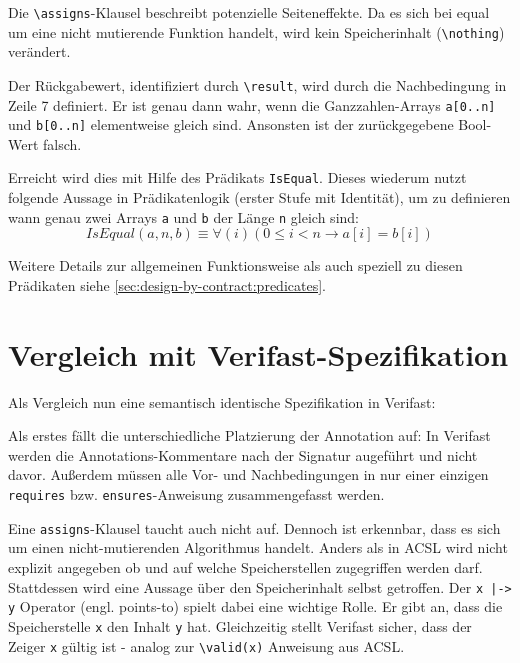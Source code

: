 Die \lstinline{\assigns}-Klausel beschreibt potenzielle Seiteneffekte. Da es sich bei equal um eine nicht mutierende
Funktion handelt, wird kein Speicherinhalt (\lstinline{\nothing}) verändert.

Der Rückgabewert, identifiziert durch \lstinline{\result}, wird durch die Nachbedingung in Zeile 7 definiert. Er ist genau dann
wahr, wenn die Ganzzahlen-Arrays \lstinline{a[0..n]} und \lstinline{b[0..n]} elementweise gleich sind. Ansonsten ist der 
zurückgegebene Bool-Wert falsch. 

Erreicht wird dies mit Hilfe des Prädikats \lstinline{IsEqual}. Dieses wiederum
nutzt folgende Aussage in Prädikatenlogik (erster Stufe mit Identität), um zu definieren wann genau 
zwei Arrays \lstinline{a} und \lstinline{b} der Länge \lstinline{n} gleich sind:
\[IsEqual(a, n, b) \equiv \forall(i) (0 \leq i < n \rightarrow a[i] = b[i])\]

Weitere Details zur allgemeinen Funktionsweise als auch speziell zu diesen Prädikaten siehe
\ref{sec:design-by-contract:predicates}.



\section{Vergleich mit Verifast-Spezifikation}
\label{sec:design-by-contract:verifast-variante}

Als Vergleich nun eine semantisch identische Spezifikation in Verifast:



Als erstes fällt die unterschiedliche Platzierung der Annotation auf: In Verifast werden die 
Annotations-Kommentare nach der Signatur augeführt und nicht davor. Außerdem müssen alle Vor- und 
Nachbedingungen in nur einer einzigen \lstinline{requires} bzw. \lstinline{ensures}-Anweisung 
zusammengefasst werden.

Eine \lstinline{assigns}-Klausel taucht auch nicht auf. Dennoch ist erkennbar, dass es sich um einen 
nicht-mutierenden Algorithmus handelt. Anders als in ACSL wird nicht explizit angegeben ob und auf welche 
Speicherstellen zugegriffen werden darf. Stattdessen wird eine Aussage über den Speicherinhalt selbst 
getroffen. Der \lstinline{x |-> y} Operator (engl. points-to) spielt dabei eine wichtige Rolle. Er gibt an, 
dass die Speicherstelle \lstinline{x} den Inhalt \lstinline{y} hat. Gleichzeitig stellt Verifast sicher, 
dass der Zeiger \lstinline{x} gültig ist - analog zur \lstinline{\valid(x)} Anweisung aus ACSL.


